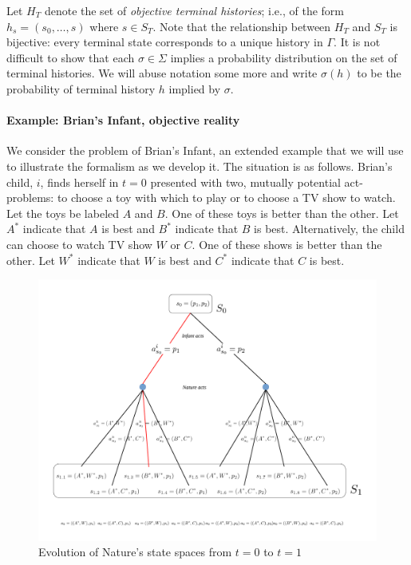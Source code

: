 \documentclass[
11pt,
titlepage,
reqno,
]{article}%
\theoremstyle{definition}
\begin{document}
Let $H_T$ denote the set of  \textit{objective terminal histories}; i.e., of the form $h_s=(s_0,\ldots,s)$ where $s\in S_T$.
Note that the relationship between $H_T$ and $S_T$ is bijective: every terminal state corresponds to a unique history in $\Gamma$.
It is not difficult to show that each $\sigma\in\Sigma$ implies a probability distribution on the set of terminal histories.
We will abuse notation some more and write $\sigma(h)$ to be the probability of terminal history $h$ implied by $\sigma$.
		
\paragraph{Example: Brian's Infant, objective reality}	
We consider the problem of Brian's Infant, an extended example that we will use  to illustrate the formalism as we develop it.
The situation is as follows.
Brian's child, $i$, finds herself in $t=0$ presented with two, mutually potential act-problems: to choose a toy with which to play or to choose a TV show to watch. 
Let the toys be labeled $A$ and $B$. 
One of these toys is better than the other. 
Let $A^\ast$ indicate that $A$ is best and $B^\ast$ indicate that $B$ is best. 
Alternatively, the child can choose to watch TV show $W$ or $C$.
One of these shows is better than the other. 
Let $W^\ast$ indicate that $W$ is best and $C^\ast$ indicate that $C$ is best.


\begin{figure}[h!]
	\centering
	\includegraphics*[page=1,trim = 0in 1in 0in 0in,scale=.6]{Awareness_Diagrams_All}
	\caption{Evolution of Nature's state spaces from $t=0$ to $t=1$\label{Diag: p-01}}%
\end{figure}
\end{document}
